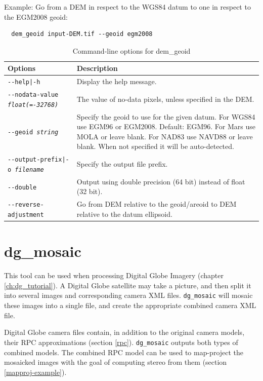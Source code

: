 Example: Go from a DEM in respect to the WGS84 datum to one in respect to the EGM2008 geoid:
\begin{verbatim}
  dem_geoid input-DEM.tif --geoid egm2008
\end{verbatim}

\begin{longtable}{|l|p{10cm}|}
\caption{Command-line options for dem\_geoid}
\label{tbl:demgeoid}
\endfirsthead
\endhead
\endfoot
\endlastfoot
\hline
Options & Description \\ \hline \hline
\texttt{-\/-help|-h} & Display the help message.\\ \hline
\texttt{-\/-nodata-value \textit{float(=-32768)}} & The value of no-data pixels, unless specified in the DEM. \\ \hline
\texttt{-\/-geoid \textit{string}} &Specify the geoid to use for the given datum. For WGS84 use EGM96 or EGM2008. Default: EGM96. For Mars use MOLA or leave blank. For NAD83 use NAVD88 or leave blank. When not specified it will be auto-detected. \\ \hline
\texttt{-\/-output-prefix|-o \textit{filename}} & Specify the output file prefix. \\ \hline
\texttt{-\/-double} & Output using double precision (64 bit) instead of float (32 bit).\\ \hline
\texttt{-\/-reverse-adjustment} & Go from DEM relative to the geoid/areoid to DEM relative to the datum ellipsoid.\\ \hline
\end{longtable}

\section{dg\_mosaic}
\label{dgmosaic}

This tool can be used when processing Digital Globe Imagery (chapter
\ref{ch:dg_tutorial}). A Digital Globe satellite may take a
picture, and then split it into several images and corresponding camera
XML files. \texttt{dg\_mosaic} will mosaic these images into a single
file, and create the appropriate combined camera XML file.

Digital Globe camera files contain, in addition to the original camera
models, their RPC approximations (section
\ref{rpc}). \texttt{dg\_mosaic} outputs both types of combined
models. The combined RPC model can be used to map-project the mosaicked
images with the goal of computing stereo from them (section
\ref{mapproj-example}).

